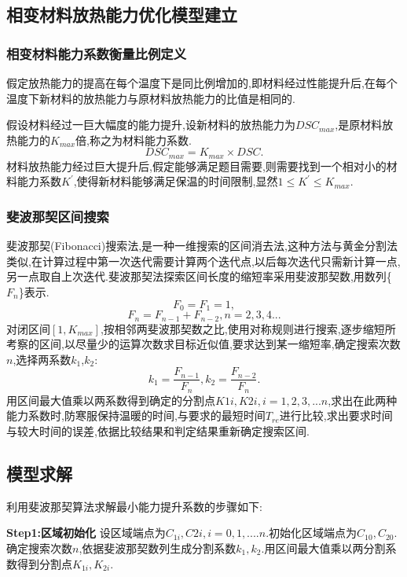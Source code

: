\documentclass{whutmod}
\begin{document}
\subsection{相变材料放热能力优化模型建立}
\subsubsection{相变材料能力系数衡量比例定义}
假定放热能力的提高在每个温度下是同比例增加的,即材料经过性能提升后,在每个温度下新材料的放热能力与原材料放热能力的比值是相同的.

假设材料经过一巨大幅度的能力提升,设新材料的放热能力为$DSC_{max}$,是原材料放热能力的$K_{max}$倍,称之为材料能力系数.
\begin{equation}
DSC_{max}=K_{max}\times DSC.
\end{equation}
材料放热能力经过巨大提升后,假定能够满足题目需要,则需要找到一个相对小的材料能力系数$K^{\prime}$,使得新材料能够满足保温的时间限制,显然$1\le K^{\prime}\leq K_{max}$.

\subsubsection{斐波那契区间搜索}
斐波那契(Fibonacci)搜索法,是一种一维搜索的区间消去法,这种方法与黄金分割法类似,在计算过程中第一次迭代需要计算两个迭代点,以后每次迭代只需新计算一点,另一点取自上次迭代.斐波那契法探索区间长度的缩短率采用斐波那契数,用数列\{$F_{n}$\}表示.
\begin{equation}
F_{0}=F_{1}=1,
\end{equation}
\begin{equation}
F_{n}=F_{n-1}+F_{n-2},n=2,3,4...
\end{equation}
对闭区间$[1,K_{max}]$,按相邻两斐波那契数之比,使用对称规则进行搜索,逐步缩短所考察的区间,以尽量少的运算次数求目标近似值,要求达到某一缩短率,确定搜索次数$n$,选择两系数$k_{1}$,$k_{2}$:
\begin{equation}
k_{1}=\frac{F_{n-1}}{F_{n}},k_{2}=\frac{F_{n-2}}{F_{n}}.
\end{equation}
用区间最大值乘以两系数得到确定的分割点$K{1i},K{2i},i=1,2,3,...n$,求出在此两种能力系数时,防寒服保持温暖的时间,与要求的最短时间$T_{re}$进行比较,求出要求时间与较大时间的误差,依据比较结果和判定结果重新确定搜索区间.
\subsection{模型求解}
利用斐波那契算法求解最小能力提升系数的步骤如下:

\textbf{Step1:区域初始化
}
设区域端点为$C_{1i},C{2i},i=0,1,....n.$初始化区域端点为$C_{10},C_{20}$.确定搜索次数$n$,依据斐波那契数列生成分割系数$k_{1},k_{2}$.用区间最大值乘以两分割系数得到分割点$K_{1i},K_{2i}.$
\end{document}
